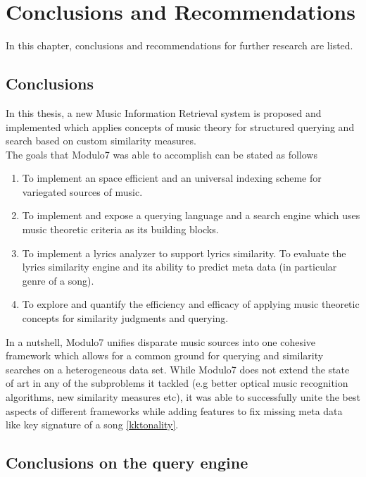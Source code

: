 \chapter{Conclusions and Recommendations}

\noindent In this chapter, conclusions and recommendations for further research are listed. 

\section{Conclusions}

\noindent In this thesis, a new Music Information Retrieval system is proposed and implemented which applies concepts of music theory for structured querying and search based on custom similarity measures. \\

\noindent The goals that Modulo7 was able to accomplish can be stated as follows
\begin{enumerate}
\item To implement an space efficient and an universal indexing scheme for variegated sources of music.
\item To implement and expose a querying language and a search engine  which uses music theoretic criteria as its building blocks. 
\item To implement a lyrics analyzer to support lyrics similarity. To evaluate the lyrics similarity engine and its ability to predict meta data (in particular genre of a song).  
\item To explore and quantify the efficiency and efficacy of applying music theoretic concepts for similarity judgments and querying.
\end{enumerate} 

\noindent In a nutshell, Modulo7 unifies disparate music sources into one cohesive framework which allows for a common ground for querying and similarity searches on a heterogeneous data set. While Modulo7 does not extend the state of art in any of the subproblems it tackled (e.g better optical music recognition algorithms, new similarity measures etc), it was able to successfully unite the best aspects of different frameworks while adding features to fix missing meta data like key signature of a song \ref{kktonality}. 

\section{Conclusions on the query engine}

